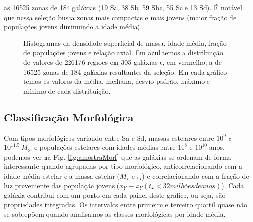 as 16525 zonas de 184 galáxias (19 Sa, 38 Sb, 59 Sbc, 55 Sc e 13 Sd). É notável que nossa seleção
busca zonas mais compactas e mais jovens (maior fração de populações jovens diminuindo a idade
média). 
\begin{figure}
	\centering
	\caption[Histogramas: densidade superficial de massa, idade média, fração de populações jovens e
	relação axial.] 
	{Histogramas da densidade superficial de massa, idade média, fração de populações jovens e relação
axial. Em azul temos a distribuição de valores de 226176 regiões em 305 galáxias e, em vermelho, a
de 16525 zonas de 184 galáxias resultantes da seleção. Em cada gráfico temos os valores da média,
mediana, desvio padrão, máximo e mínimo de cada distribuição.}
	\label{fig:histosample}
\end{figure}

\subsection{Classificação Morfológica}
\label{sec:amostra:morf}

Com tipos morfológicos variando entre Sa e Sd, massas estelares entre $10^9$ e $10^{11.5}\ M_\odot$
e populações estelares com idades médias entre $10^8$ e $10^{10}$ anos, podemos ver na Fig.
\ref{fig:amostraMorf} que as galáxias se ordenam de forma interessante quando agrupadas por tipo
morfológico, anticorrelacionando com a idade média estelar e a massa estelar ($M_\star$ e $t_\star$)
e correlacionando com a fração de luz proveniente das população jovens ($x_Y \equiv x_Y(t_\star < 32
milhões de anos)$). Cada galáxia contribui com um ponto em cada painel deste gráfico, ou seja, são
propriedades integradas. Os intervalos entre primeiro e terceiro quartil quase não se sobrepõem
quando analisamos as classes morfológicas por idade média.

